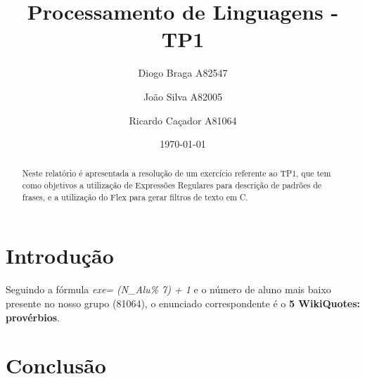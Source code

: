 \documentclass[a4paper]{article}
\title{Processamento de Linguagens - TP1}
\author{Diogo Braga A82547 \and João Silva A82005 \and Ricardo Caçador A81064}
\date{\today}
\begin{document}
\maketitle

\begin{abstract}
Neste relatório é apresentada a resolução de um exercício referente ao TP1, que tem como objetivos a utilização de Expressões Regulares para descrição de padrões de frases, e a utilização do Flex para gerar filtros de texto em C.
\end{abstract}

\tableofcontents

\newpage


\section{Introdução}
\label{sec:intro}

Seguindo a fórmula \emph{exe= (N\_Alu\% 7) + 1} e o número de aluno mais baixo presente no nosso grupo (81064), o enunciado correspondente é o \textbf{5 WikiQuotes: provérbios}.

\section{Conclusão}
\label{sec:conclusao}
\end{document}
